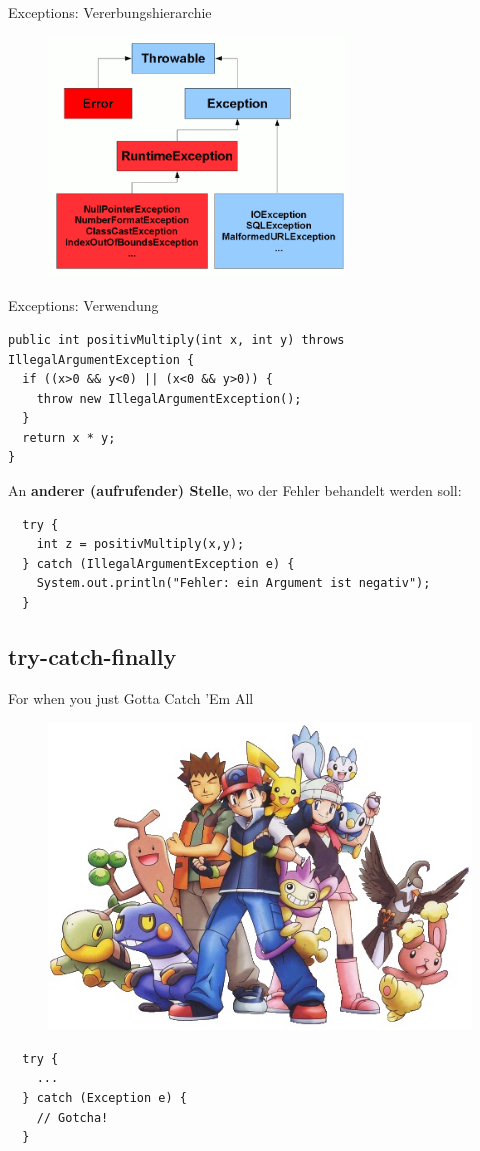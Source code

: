 \documentclass[18pt]{beamer}
\begin{document}
\begin{frame}[fragile]{Exceptions: Vererbungshierarchie}
\begin{figure}[ht]
	\centering
  \includegraphics[width=0.7\textwidth]{ExceptionHierarchy.png}
\end{figure}
\end{frame}

\begin{frame}[fragile]{Exceptions: Verwendung}
	\begin{lstlisting}
public int positivMultiply(int x, int y) throws IllegalArgumentException {
  if ((x>0 && y<0) || (x<0 && y>0)) {
    throw new IllegalArgumentException();
  }
  return x * y;
}
  \end{lstlisting}
  \pause
  An \textbf{anderer (aufrufender) Stelle}, wo der Fehler behandelt werden soll:
  \begin{lstlisting}
  try {
    int z = positivMultiply(x,y);
  } catch (IllegalArgumentException e) {
    System.out.println("Fehler: ein Argument ist negativ");
  }
  \end{lstlisting}
\end{frame}

\subsection{try-catch-finally}
\begin{frame}[fragile]{For when you just Gotta Catch 'Em All}
	\begin{figure}%
  \includegraphics[width=0.5\columnwidth]{pokemon.jpeg}%
  \end{figure}
  \begin{lstlisting}
  try {
    ...
  } catch (Exception e) {
    // Gotcha!
  }
  \end{lstlisting}
\end{frame}
\end{document}
